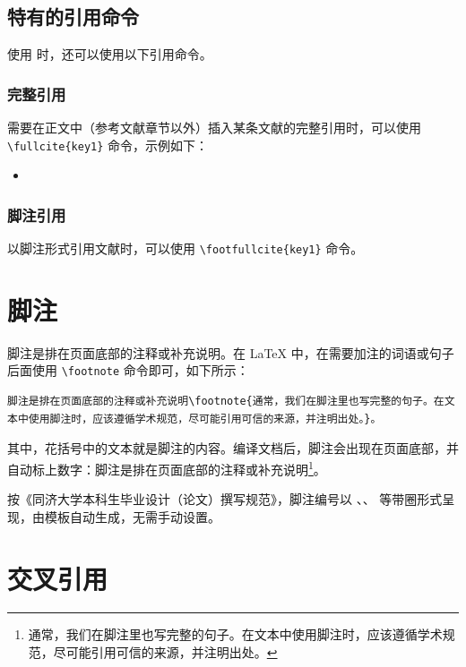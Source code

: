 \ifx\fullcite\undefined\else
\subsection{\BibLaTeX{}特有的引用命令}

使用  时，还可以使用以下引用命令。

\subsubsection{完整引用}

需要在正文中（参考文献章节以外）插入某条文献的完整引用时，可以使用 \verb|\fullcite{key1}| 命令，示例如下：

\begin{itemize}
    \item {}
\end{itemize}

\subsubsection{脚注引用}

以脚注形式引用文献时，可以使用 \verb|\footfullcite{key1}| 命令。
\fi


\section{脚注}

脚注是排在页面底部的注释或补充说明。在 \LaTeX{} 中，在需要加注的词语或句子后面使用 \verb|\footnote| 命令即可，如下所示：

\begin{Verbatim}
脚注是排在页面底部的注释或补充说明\footnote{通常，我们在脚注里也写完整的句子。在文本中使用脚注时，应该遵循学术规范，尽可能引用可信的来源，并注明出处。}。
\end{Verbatim}

其中，花括号中的文本就是脚注的内容。编译文档后，脚注会出现在页面底部，并自动标上数字：脚注是排在页面底部的注释或补充说明\footnote{通常，我们在脚注里也写完整的句子。在文本中使用脚注时，应该遵循学术规范，尽可能引用可信的来源，并注明出处。}。

按《同济大学本科生毕业设计（论文）撰写规范》，脚注编号以 、、 等带圈形式呈现，由模板自动生成，无需手动设置。

\section{交叉引用}

